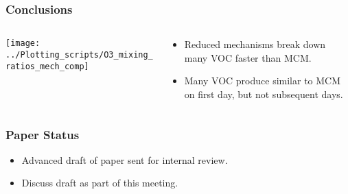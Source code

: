 \begin{frame}
    \frametitle{Conclusions}
    \begin{columns}[onlytextwidth]
        \begin{column}{0.5\textwidth}
            \vspace{-4mm}
            \hspace{-9.8mm}
            \texttt{[image: ../Plotting\_scripts/O3\_mixing\_ratios\_mech\_comp]}
        \end{column}%
        \begin{column}{0.5\textwidth} 
            \vspace{-4mm}
            \begin{itemize}
                \item Reduced mechanisms break down many VOC faster than MCM. \vspace{4mm}
                \item Many VOC produce similar  to MCM on first day, but not subsequent days. 
            \end{itemize}
        \end{column}
    \end{columns}
\end{frame}

\begin{frame}
    \frametitle{Paper Status}
    \begin{itemize}
        \item Advanced draft of paper sent for internal review. \vspace{1cm}
        \item Discuss draft as part of this meeting.
    \end{itemize}
\end{frame}
